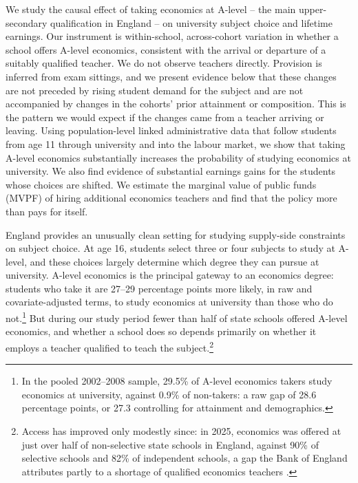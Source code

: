 
We study the causal effect of taking economics at A-level -- the main upper-secondary qualification in England -- on university subject choice and lifetime earnings. Our instrument is within-school, across-cohort variation in whether a school offers A-level economics, consistent with the arrival or departure of a suitably qualified teacher. We do not observe teachers directly. Provision is inferred from exam sittings, and we present evidence below that these changes are not preceded by rising student demand for the subject and are not accompanied by changes in the cohorts' prior attainment or composition. This is the pattern we would expect if the changes came from a teacher arriving or leaving. Using population-level linked administrative data that follow students from age 11 through university and into the labour market, we show that taking A-level economics substantially increases the probability of studying economics at university. We also find evidence of substantial earnings gains for the students whose choices are shifted. We estimate the marginal value of public funds (MVPF) of hiring additional economics teachers and find that the policy more than pays for itself.


England provides an unusually clean setting for studying supply-side constraints on subject choice. At age 16, students select three or four subjects to study at A-level, and these choices largely determine which degree they can pursue at university. A-level economics is the principal gateway to an economics degree: students who take it are 27--29 percentage points more likely, in raw and covariate-adjusted terms, to study economics at university than those who do not.\footnote{In the pooled 2002--2008 sample, 29.5\% of A-level economics takers study economics at university, against 0.9\% of non-takers: a raw gap of 28.6 percentage points, or 27.3 controlling for attainment and demographics.} But during our study period fewer than half of state schools offered A-level economics, and whether a school does so depends primarily on whether it employs a teacher qualified to teach the subject.\footnote{Access has improved only modestly since: in 2025, economics was offered at just over half of non-selective state schools in England, against 90\% of selective schools and 82\% of independent schools, a gap the Bank of England attributes partly to a shortage of qualified economics teachers \citep{boe2025economics}.}

